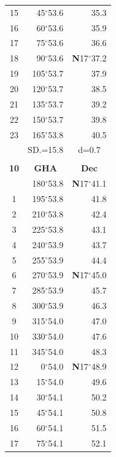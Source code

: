 \documentclass[10pt, a4paper]{report}
\begin{document}
\begin{scriptsize}
\begin{tabular*}{0.2\textwidth}[t]{@{\extracolsep{\fill}}|c|rr|}
15 & 45$^\circ$53.6 & \raisebox{0.24ex}{\boldmath$\cdot$~\boldmath$\cdot$~~}35.3\\
16 & 60$^\circ$53.6 & 35.9\\
17 & 75$^\circ$53.6 & 36.6\\[2Pt]
18 & 90$^\circ$53.6 & \textbf{N}17$^\circ$37.2\\
19 & 105$^\circ$53.7 & 37.9\\
20 & 120$^\circ$53.7 & 38.5\\
21 & 135$^\circ$53.7 & \raisebox{0.24ex}{\boldmath$\cdot$~\boldmath$\cdot$~~}39.2\\
22 & 150$^\circ$53.7 & 39.8\\
23 & 165$^\circ$53.8 & 40.5\\
\hline
\rule{0pt}{2.4ex} & \multicolumn{1}{c}{SD.=15.8} & \multicolumn{1}{c|}{d=0.7}\\
\hline
\multicolumn{1}{c}{}\\[-0.5ex]\hline
\multicolumn{1}{|c|}{\rule{0pt}{2.6ex}\textbf{10}} & \multicolumn{1}{c}{\textbf{GHA}} & \multicolumn{1}{c|}{\textbf{Dec}}\\
\hline\rule{0pt}{2.6ex}\noindent
0 & 180$^\circ$53.8 & \textbf{N}17$^\circ$41.1\\
1 & 195$^\circ$53.8 & 41.8\\
2 & 210$^\circ$53.8 & 42.4\\
3 & 225$^\circ$53.8 & \raisebox{0.24ex}{\boldmath$\cdot$~\boldmath$\cdot$~~}43.1\\
4 & 240$^\circ$53.9 & 43.7\\
5 & 255$^\circ$53.9 & 44.4\\[2Pt]
6 & 270$^\circ$53.9 & \textbf{N}17$^\circ$45.0\\
7 & 285$^\circ$53.9 & 45.7\\
8 & 300$^\circ$53.9 & 46.3\\
9 & 315$^\circ$54.0 & \raisebox{0.24ex}{\boldmath$\cdot$~\boldmath$\cdot$~~}47.0\\
10 & 330$^\circ$54.0 & 47.6\\
11 & 345$^\circ$54.0 & 48.3\\[2Pt]
12 & 0$^\circ$54.0 & \textbf{N}17$^\circ$48.9\\
13 & 15$^\circ$54.0 & 49.6\\
14 & 30$^\circ$54.1 & 50.2\\
15 & 45$^\circ$54.1 & \raisebox{0.24ex}{\boldmath$\cdot$~\boldmath$\cdot$~~}50.8\\
16 & 60$^\circ$54.1 & 51.5\\
17 & 75$^\circ$54.1 & 52.1\\[2Pt]

\end{tabular*}
\end{scriptsize}
\end{document}
